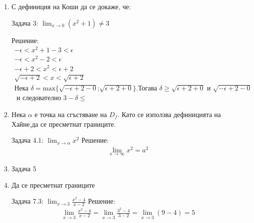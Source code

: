 \documentclass[a4paper, 20pt, fleqn, border=2pt]{article}
\begin{document}
\begin{enumerate}
    \item С дефиниция на Коши да се докаже, че:
\par
\par

Задача 3: $\lim_{x\to0}(x^2 + 1) \neq 3$

Решение:
\begin{equation}
\begin{split}
    -\epsilon < x^2 + 1 - 3 < \epsilon \\
    -\epsilon < x^2 - 2 < \epsilon \\
    -\epsilon + 2 < x^2 < \epsilon + 2 \\
    \sqrt{-\epsilon + 2} < x < \sqrt{\epsilon + 2} \\
    \text{Нека } \delta = \text{max}\{\sqrt{-\epsilon + 2 - 0} \text{;} \sqrt{\epsilon + 2 + 0}\} \text{.Тогава } \delta \geq \sqrt{\epsilon + 2 + 0} \text{ и } \sqrt{-\epsilon + 2 - 0} \\
    \text{ и следователно } 3 - \delta \leq 
\end{split}
\end{equation}

    \item Нека $\alpha$ е точка на сгъстяване на $D_f$. Като се използва дефиницията на Хайне,да се пресметнат границите.
\par
\par

Задача 4.1: $\lim_{x\to\alpha}x^2$
Решение:
\begin{equation}
\begin{split}
    \lim_{x\to\infty}x^2 = a^2
\end{split}
\end{equation}


    \item Задача 5
\par
\par


    \item Да се пресметнат границите
\par
\par

Задача 7.3: $\lim_{x\to3}\frac{x^2 - 4}{x - 2}$
Решение:
\begin{equation}
\begin{split}
    \lim_{x\to3}\frac{x^2 - 4}{x - 2} =  \lim_{x\to3}\frac{3^2 - 4}{3 - 2} = \lim_{x\to3}(9-4) = 5
\end{split}
\end{equation}


\end{enumerate}
\end{document}
